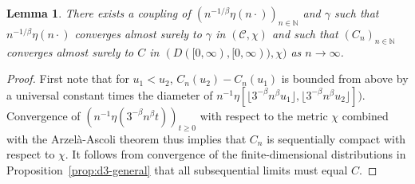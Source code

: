 \documentclass{article}
\newcommand{\N}{\mathbb{N}}
\newcommand{\1}{\mathbf{1}}
\newtheorem{lemma}[theorem]{Lemma}
\theoremstyle{definition}
\numberwithin{equation}{section}
\numberwithin{theorem}{section}
\begin{document}
\begin{lemma}\label{lem:convergence-Cn}
There exists a coupling of $(n^{-1/\beta}\eta(n\cdot))_{n\in\N}$ and $\gamma$ such that $n^{-1/\beta}\eta(n\cdot)$ converges almost surely to $\gamma$ in $(\mathcal{C},\chi)$ and such that $(C_n)_{n\in\N}$ converges almost surely to $C$ in $(D([0,\infty),[0,\infty)),\chi)$ as $n\rightarrow\infty$.
\end{lemma}
\begin{proof}
First note that for $u_1<u_2$, $C_n(u_2)-C_n(u_1)$ is bounded from above by a universal constant times the diameter of $n^{-1}\eta[\lfloor3^{-\beta}n^\beta u_1\rfloor,\lfloor 3^{-\beta}n^\beta u_2\rfloor])$. Convergence of $(n^{-1}\eta(3^{-\beta}n^\beta t))_{t\geq0}$ with respect to the metric $\chi$ combined with the Arzel\`a-Ascoli theorem thus implies that $C_n$ is sequentially compact with respect to $\chi$. It follows from convergence of the finite-dimensional distributions in Proposition~\ref{prop:d3-general} that all subsequential limits must equal $C$.
\end{proof}
\end{document}
